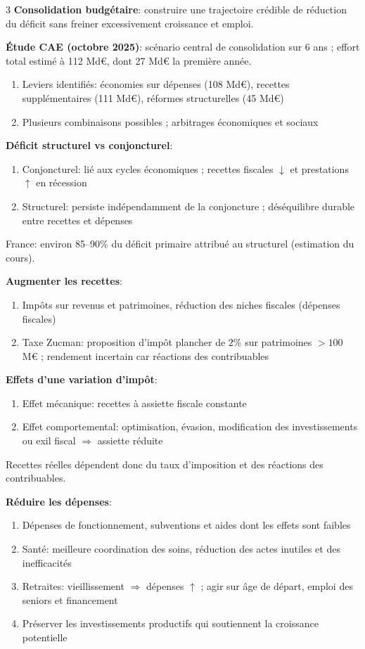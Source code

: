 \documentclass[12pt, a4paper]{article}
\begin{document}
\begin{multicols*}{3}
\textbf{Consolidation budgétaire}: construire une trajectoire crédible de réduction du déficit sans freiner excessivement croissance et emploi.

\textbf{Étude CAE (octobre 2025)}: scénario central de consolidation sur 6 ans ; effort total estimé à 112 Md€, dont 27 Md€ la première année.
\begin{enumerate}[\roman*.]
  \item Leviers identifiés: économies sur dépenses (108 Md€), recettes supplémentaires (111 Md€), réformes structurelles (45 Md€)
  \item Plusieurs combinaisons possibles ; arbitrages économiques et sociaux
\end{enumerate}

\textbf{Déficit structurel vs conjoncturel}:
\begin{enumerate}[\roman*.]
  \item Conjoncturel: lié aux cycles économiques ; recettes fiscales $\downarrow$ et prestations $\uparrow$ en récession
  \item Structurel: persiste indépendamment de la conjoncture ; déséquilibre durable entre recettes et dépenses
\end{enumerate}
France: environ 85--90\% du déficit primaire attribué au structurel (estimation du cours).

\textbf{Augmenter les recettes}:
\begin{enumerate}[\roman*.]
  \item Impôts sur revenus et patrimoines, réduction des niches fiscales (dépenses fiscales)
  \item Taxe Zucman: proposition d'impôt plancher de $2\%$ sur patrimoines $>100$ M€ ; rendement incertain car réactions des contribuables
\end{enumerate}

\textbf{Effets d'une variation d'impôt}:
\begin{enumerate}[\roman*.]
  \item Effet mécanique: recettes à assiette fiscale constante
  \item Effet comportemental: optimisation, évasion, modification des investissements ou exil fiscal $\Rightarrow$ assiette réduite
\end{enumerate}
Recettes réelles dépendent donc du taux d'imposition et des réactions des contribuables.

\textbf{Réduire les dépenses}:
\begin{enumerate}[\roman*.]
  \item Dépenses de fonctionnement, subventions et aides dont les effets sont faibles
  \item Santé: meilleure coordination des soins, réduction des actes inutiles et des inefficacités
  \item Retraites: vieillissement $\Rightarrow$ dépenses $\uparrow$ ; agir sur âge de départ, emploi des seniors et financement
  \item Préserver les investissements productifs qui soutiennent la croissance potentielle
\end{enumerate}


\end{multicols*}
\end{document}
